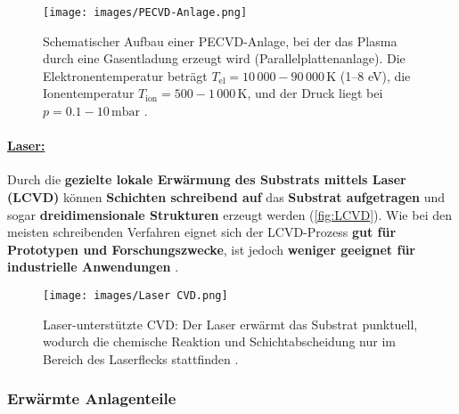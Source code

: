 \documentclass{article} %
\begin{document}
\begin{figure}[htb!]
    \centering
    \texttt{[image: images/PECVD-Anlage.png]} %
    \captionsetup{labelfont=bf, width=.9\textwidth} %
    \caption{Schematischer Aufbau einer PECVD-Anlage, bei der das Plasma durch eine Gasentladung erzeugt wird (Parallelplattenanlage). Die Elektronentemperatur beträgt $T_\mathrm{el} = 10\,000{-}90\,000 \, \mathrm{K}$ (1–8 eV), die Ionentemperatur $T_\mathrm{ion} = 500{-}1\,000 \, \mathrm{K}$, und der Druck liegt bei $p = 0.1{-}10 \, \mathrm{mbar}$ \cite{keplinger2024CVD}.}
    \label{fig:PECVD}
\end{figure}

\vspace{0.0em}

\paragraph{\uline{Laser:}} Durch die \textbf{gezielte lokale Erwärmung des Substrats mittels Laser (LCVD)} können \textbf{Schichten schreibend auf} das \textbf{Substrat aufgetragen} und sogar \textbf{dreidimensionale Strukturen} erzeugt werden (\autoref{fig:LCVD}). Wie bei den meisten schreibenden Verfahren eignet sich der LCVD-Prozess \textbf{gut für Prototypen und Forschungszwecke}, ist jedoch \textbf{weniger geeignet für industrielle Anwendungen} \cite{keplinger2024CVD}.

\begin{figure}[htb!]
    \centering
    \texttt{[image: images/Laser CVD.png]} %
    \captionsetup{labelfont=bf, width=.65\textwidth} %
    \caption{Laser-unterstützte CVD: Der Laser erwärmt das Substrat punktuell, wodurch die chemische Reaktion und Schichtabscheidung nur im Bereich des Laserflecks stattfinden \cite{keplinger2024CVD}.}
    \label{fig:LCVD}
\end{figure}





\vspace{1em}

\subsubsection{Erwärmte Anlagenteile} %
\end{document}
